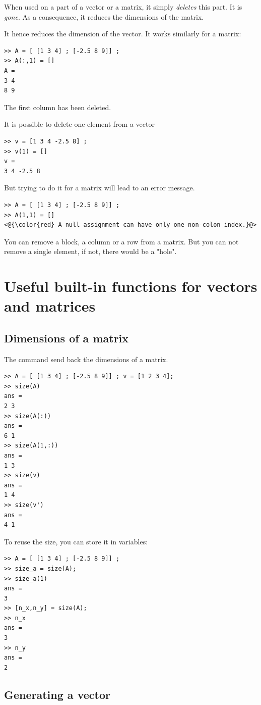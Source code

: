 				When used on a part of a vector or a matrix, it simply \emph{deletes} this part.
				It is \emph{gone}.
				As a consequence, it reduces the dimensions of the matrix.

				It hence reduces the dimension of the vector. It works similarly for a matrix:
\begin{lstlisting}
>> A = [ [1 3 4] ; [-2.5 8 9]] ;
>> A(:,1) = []
A = 
3 4
8 9
\end{lstlisting}
				The first column has been deleted.

				It is possible to delete one element from a vector 
\begin{lstlisting}
>> v = [1 3 4 -2.5 8] ;
>> v(1) = []
v = 
3 4 -2.5 8
\end{lstlisting}
				But trying to do it for a matrix will lead to an error message.
\begin{lstlisting}
>> A = [ [1 3 4] ; [-2.5 8 9]] ;
>> A(1,1) = []
<@{\color{red} A null assignment can have only one non-colon index.}@>
\end{lstlisting}
				You can remove a block, a column or a row from a matrix. 
				But you can not remove a single element, if not, there would be a "hole".


\section{Useful built-in functions for vectors and matrices}
	\subsection{Dimensions of a matrix}
		The command  send back the dimensions of a matrix.
\begin{lstlisting}
>> A = [ [1 3 4] ; [-2.5 8 9]] ; v = [1 2 3 4];
>> size(A)
ans = 
2 3
>> size(A(:))
ans =
6 1
>> size(A(1,:))
ans =
1 3
>> size(v)
ans = 
1 4
>> size(v')
ans = 
4 1
\end{lstlisting}
		To reuse the size, you can store it in variables:
\begin{lstlisting}
>> A = [ [1 3 4] ; [-2.5 8 9]] ; 
>> size_a = size(A);
>> size_a(1)
ans =
3
>> [n_x,n_y] = size(A);
>> n_x
ans = 
3
>> n_y
ans = 
2
\end{lstlisting}

	\subsection{Generating a vector}
